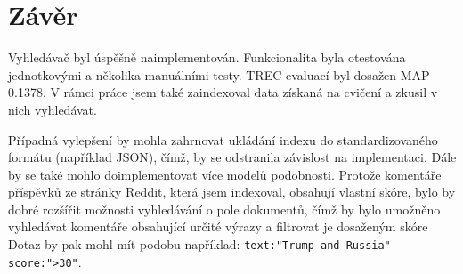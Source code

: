 \documentclass[11pt,a4paper]{scrartcl}
\begin{document}
	\section{Závěr}
	
	Vyhledávač byl úspěšně naimplementován. Funkcionalita byla otestována jednotkovými a několika manuálními testy. TREC evaluací byl dosažen MAP 0.1378. V rámci práce jsem také zaindexoval data získaná na cvičení a zkusil v nich vyhledávat.
	
	Případná vylepšení by mohla zahrnovat ukládání indexu do standardizovaného formátu (například JSON), čímž, by se odstranila závislost na implementaci. Dále by se také mohlo doimplementovat více modelů podobnosti. Protože komentáře příspěvků ze stránky Reddit, která jsem indexoval, obsahují vlastní skóre, bylo by dobré rozšířit možnosti vyhledávání o pole dokumentů, čímž by bylo umožněno vyhledávat komentáře obsahující určité výrazy a filtrovat je dosaženým skóre Dotaz by pak mohl mít podobu například: \verb|text:"Trump and Russia" score:">30"|.
	
\end{document}
